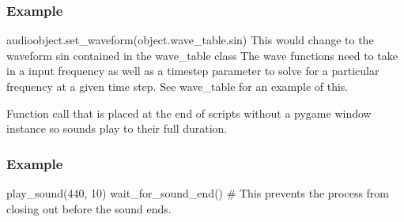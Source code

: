 \documentclass[letterpaper,10pt,english,openany,oneside]{sphinxmanual}
\begin{document}
\begin{fulllineitems}
\begin{fulllineitems}
\subsubsection*{Example}

\sphinxAtStartPar
audioobject.set\_waveform(object.wave\_table.sin)
This would change to the waveform sin contained in the wave\_table class
The wave functions need to take in a input frequency as well as a timestep parameter
to solve for a particular frequency at a given time step. See wave\_table for an example of this.

\end{fulllineitems}



\begin{fulllineitems}

\pysigstartsignatures
{}
\pysigstopsignatures
\sphinxAtStartPar
Function call that is placed at the end of scripts without a pygame window instance so sounds play to their full duration.
\subsubsection*{Example}

\sphinxAtStartPar
play\_sound(440, 10)
wait\_for\_sound\_end() \# This prevents the process from closing out before the sound ends.

\end{fulllineitems}


\end{fulllineitems}
\end{document}

